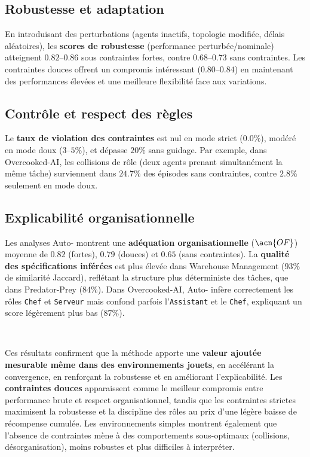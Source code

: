 \subsection*{Robustesse et adaptation}

En introduisant des perturbations (agents inactifs, topologie modifiée, délais aléatoires), les \textbf{scores de robustesse} (performance perturbée/nominale) atteignent $0.82$–$0.86$ sous contraintes fortes, contre $0.68$–$0.73$ sans contraintes.
Les contraintes douces offrent un compromis intéressant ($0.80$–$0.84$) en maintenant des performances élevées et une meilleure flexibilité face aux variations.

\subsection*{Contrôle et respect des règles}

Le \textbf{taux de violation des contraintes} est nul en mode strict ($0.0\%$), modéré en mode doux ($3$–$5\%$), et dépasse $20\%$ sans guidage.
Par exemple, dans Overcooked-AI, les collisions de rôle (deux agents prenant simultanément la même tâche) surviennent dans $24.7\%$ des épisodes sans contraintes, contre $2.8\%$ seulement en mode doux.

\subsection*{Explicabilité organisationnelle}

Les analyses Auto- montrent une \textbf{adéquation organisationnelle} ($\acn{OF}$) moyenne de $0.82$ (fortes), $0.79$ (douces) et $0.65$ (sans contraintes).
La \textbf{qualité des spécifications inférées} est plus élevée dans Warehouse Management ($93\%$ de similarité Jaccard), reflétant la structure plus déterministe des tâches, que dans Predator-Prey ($84\%$).
Dans Overcooked-AI, Auto- infère correctement les rôles \texttt{Chef} et \texttt{Serveur} mais confond parfois l'\texttt{Assistant} et le \texttt{Chef}, expliquant un score légèrement plus bas ($87\%$).

\

Ces résultats confirment que la méthode  apporte une \textbf{valeur ajoutée mesurable même dans des environnements jouets}, en accélérant la convergence, en renforçant la robustesse et en améliorant l'explicabilité.
Les \textbf{contraintes douces} apparaissent comme le meilleur compromis entre performance brute et respect organisationnel, tandis que les contraintes strictes maximisent la robustesse et la discipline des rôles au prix d'une légère baisse de récompense cumulée.
Les environnements simples montrent également que l'absence de contraintes mène à des comportements sous-optimaux (collisions, désorganisation), moins robustes et plus difficiles à interpréter.


